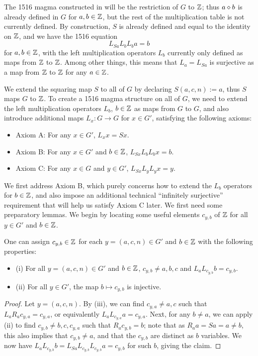 The 1516 magma constructed in  will be the restriction of $G$ to $\mathbb{Z}$; thus $a \diamond b$ is already defined in $G$ for $a,b \in \mathbb{Z}$, but the rest of the multiplication table is not currently defined.  By construction, $S$ is already defined and equal to the identity on $\mathbb{Z}$, and we have the 1516 equation
$$ L_{Sa} L_b L_b a = b$$
for $a,b \in \mathbb{Z}$, with the left multiplication operators $L_b$ currently only defined as maps from $\mathbb{Z}$ to $\mathbb{Z}$.  Among other things, this means that $L_a = L_{Sa}$ is surjective as a map from $\mathbb{Z}$ to $\mathbb{Z}$ for any $a \in \mathbb{Z}$.

We extend the squaring map $S$ to all of $G$ by declaring $S(a,c,n) := a$, thus $S$ maps $G$ to $\mathbb{Z}$.  To create a 1516 magma structure on all of $G$, we need to extend the left multiplication operators $L_b$, $b \in \mathbb{Z}$ as maps from $G$ to $G$, and also introduce additional maps $L_x: G \to G$ for $x \in G'$, satisfying the following axioms:

\begin{itemize}
\item Axiom A: For any $x \in G'$, $L_x x = Sx$.
\item Axiom B: For any $x \in G'$ and $b \in \mathbb{Z}$, $L_{Sx} L_b L_b x = b$.
\item Axiom C: For any $x \in G$ and $y \in G'$, $L_{Sx} L_y L_y x = y$.
\end{itemize}

We first address Axiom B, which purely concerns how to extend the $L_b$ operators for $b \in \mathbb{Z}$, and also impose an additional technical ``infinitely surjective'' requirement that will help us satisfy Axiom C later.  We first need some preparatory lemmas.  We begin by locating some useful elements $c_{y,b}$ of $\mathbb{Z}$ for all $y \in G'$ and $b \in \mathbb{Z}$.

\begin{lemma}\label{aux}  One can assign $c_{y,b} \in \mathbb{Z}$ for each $y = (a,c,n) \in G'$ and $b \in \mathbb{Z}$ with the following properties:
\begin{itemize}
\item (i)  For all $y = (a,c,n) \in G'$ and $b \in \mathbb{Z}$, $c_{y,b} \neq a,b,c$ and $L_a L_{c_{y,b}} b = c_{y,b}$.
\item (ii) For all $y \in G'$, the map $b \mapsto c_{y,b}$ is injective.
\end{itemize}

\end{lemma}

\begin{proof}  Let $y = (a,c,n)$.  By  (iii), we can find $c_{y,a} \neq a,c$ such that $L_a R_a c_{y,a} = c_{y,a}$, or equivalently $L_a L_{c_{y,a}} a = c_{y,a}$.  Next, for any $b \neq a$, we can apply  (ii) to find $c_{y,b} \neq b, c, c_{y,a}$ such that $R_a c_{y,b} = b$; note that as $R_a a = Sa = a \neq b$, this also implies that $c_{y,b} \neq a$, and that the $c_{y,b}$ are distinct as $b$ variables.  We now have $L_a L_{c_{y,b}} b = L_{Sa} L_{c_{y,b}} L_{c_{y,b}} a = c_{y,b}$ for such $b$, giving the claim.
\end{proof}

